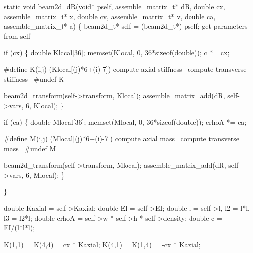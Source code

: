 \nwendcode{}\nwdocspar

\nwenddocs{}\plusendmoddef
static void beam2d_dR(void* pself, assemble_matrix_t* dR, 
                      double cx, assemble_matrix_t* x,
                      double cv, assemble_matrix_t* v,
                      double ca, assemble_matrix_t* a)
\{
    beam2d_t* self = (beam2d_t*) pself;
    \LA{}get parameters from \code{}self\edoc{}~{\nwtagstyle{}}\RA{}

    if (cx) \{
        double Klocal[36];
        memset(Klocal, 0, 36*sizeof(double));
        c *= cx;

        #define K(i,j) (Klocal[(j)*6+(i)-7])
        \LA{}compute axial stiffness~{\nwtagstyle{}}\RA{}
        \LA{}compute transverse stiffness~{\nwtagstyle{}}\RA{}
        #undef K

        beam2d_transform(self->transform, Klocal);
        assemble_matrix_add(dR, self->vars, 6, Klocal);
    \}

    if (ca) \{
        double Mlocal[36];
        memset(Mlocal, 0, 36*sizeof(double));
        crhoA *= ca;

        #define M(i,j) (Mlocal[(j)*6+(i)-7])
        \LA{}compute axial mass~{\nwtagstyle{}}\RA{}
        \LA{}compute transverse mass~{\nwtagstyle{}}\RA{}
        #undef M

        beam2d_transform(self->transform, Mlocal);
        assemble_matrix_add(dR, self->vars, 6, Mlocal);
    \}

\}

\nwendcode{}\nwdocspar

\nwenddocs{}\endmoddef
double Kaxial = self->Kaxial;
double EI     = self->EI;
double l      = self->l, l2 = l*l, l3 = l2*l;
double crhoA  = self->w * self->h * self->density;
double c      = EI/(l*l*l);
\nwendcode{}\nwdocspar

\nwenddocs{}\endmoddef
K(1,1) = K(4,4) =  cx * Kaxial;
K(4,1) = K(1,4) = -cx * Kaxial;

